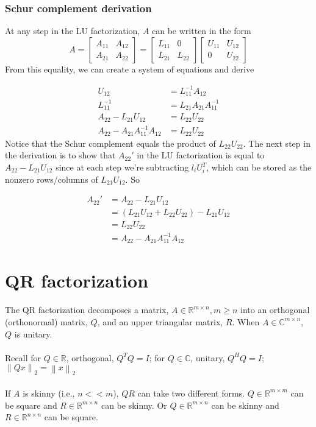 \documentclass{article}
\newcommand{\norm}[2]{\left\lVert#1\right\rVert_#2}
\begin{document}
\subsubsection{Schur complement derivation}
At any step in the LU factorization, $A$ can be written in the form
\begin{equation*}
    A = \begin{bmatrix} A_{11} & A_{12}\\ A_{21} & A_{22}\end{bmatrix} = \begin{bmatrix} L_{11} & 0\\ L_{21} & L_{22}\end{bmatrix}
    \begin{bmatrix} U_{11} & U_{12}\\ 0 & U_{22}\end{bmatrix}
\end{equation*}
From this equality, we can create a system of equations and derive

\begin{align*}
    U_{12} &= L_{11}^{-1}A_{12}\\
    L_{11}^{-1} &= L_{21}A_{21}A_{11}^{-1}\\
    A_{22} - L_{21}U_{12} &= L_{22}U_{22}\\
    A_{22} - A_{21}A_{11}^{-1}A_{12} &= L_{22}U_{22}
\end{align*}
Notice that the Schur complement equals the product of $L_{22}U_{22}$. The next step in the derivation is to show that $A_{22}'$ in the LU factorization is equal to $A_{22} - L_{21}U_{12}$ since at each step we're subtracting $l_iU_i^T$, which can be stored as the nonzero rows/columns of $L_{21}U_{12}$. So

\begin{align*}
    A_{22}' &= A_{22} - L_{21}U_{12} \\
    &= (L_{21}U_{12} + L_{22}U_{22}) - L_{21}U_{12}\\
    &= L_{22}U_{22}\\
    &= A_{22} - A_{21}A_{11}^{-1}A_{12}
\end{align*}

\section{QR factorization}
The QR factorization decomposes a matrix, $A \in \mathbb{R}^{m \times n}, m \geq n$ into an orthogonal (orthonormal) matrix, $Q$, and an upper triangular matrix, $R$. When $A \in \mathbb{C}^{m \times n}$, $Q$ is unitary.\\ \\
Recall for $Q \in \mathbb{R}$, orthogonal, $Q^TQ = I$; for $Q \in \mathbb{C}$, unitary, $Q^HQ = I$; $\norm{Qx}{2} = \norm{x}{2}$\\ \\
If $A$ is skinny (i.e., $n << m$), $QR$ can take two different forms. $Q \in \mathbb{R}^{m \times m}$ can be square and $R \in \mathbb{R}^{m \times n}$ can be skinny. Or $Q \in \mathbb{R}^{m \times n}$ can be skinny and $R \in \mathbb{R}^{n \times n}$ can be square.
\end{document}
